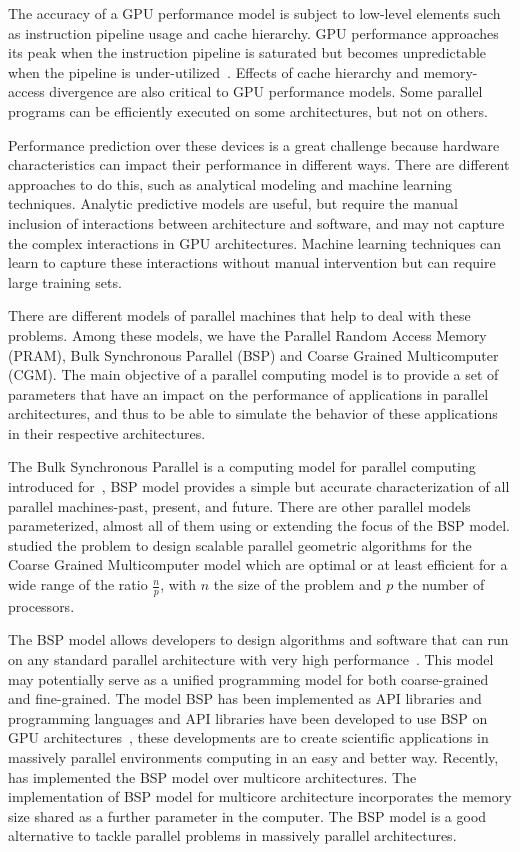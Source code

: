 The accuracy of a GPU performance model is subject to low-level elements such as instruction pipeline usage and cache hierarchy. GPU performance approaches its peak when the instruction pipeline is saturated but becomes unpredictable when the pipeline is under-utilized~\citep{Baghsorkhi:2010:APM}. Effects of cache hierarchy and memory-access divergence are also critical to GPU performance models. Some parallel programs can be efficiently executed on some architectures, but not on others. 

Performance prediction over these devices is a great challenge because hardware characteristics can impact their performance in different ways. There are different approaches to do this, such as analytical modeling and machine learning techniques. Analytic predictive models are useful, but require the manual inclusion of interactions between architecture and software, and may not capture the complex interactions in GPU architectures. Machine learning techniques can learn to capture these interactions without manual intervention but can require large training sets. 

There are different models of parallel machines that help to deal with these problems. Among these models, we have the Parallel Random Access Memory (PRAM), Bulk Synchronous Parallel (BSP) and Coarse Grained Multicomputer (CGM). The main objective of a parallel computing model is to provide a set of parameters that have an impact on the performance of applications in parallel architectures, and thus to be able to simulate the behavior of these applications in their respective architectures.

The Bulk Synchronous Parallel is a computing model for parallel computing introduced for~\cite{Valiant:1990}, BSP model provides a simple but accurate characterization of all parallel machines-past, present, and future. There are other parallel models parameterized, almost all of them using or extending the focus of the BSP model. \cite{Dehne:2002} studied the problem to design scalable parallel geometric algorithms for the Coarse Grained Multicomputer model which are optimal or at least efficient for a wide range of the ratio $\frac{n}{p}$, with $n$ the size of the problem and $p$ the number of processors.

The BSP model allows developers to design algorithms and software that can run on any standard parallel architecture with very high performance~\citep{goldchleger2005implementation}. This model may potentially serve as a unified programming model for both coarse-grained and fine-grained. The model BSP has been implemented as API libraries and programming languages \citep{BSPLib} and API libraries have been developed to use BSP on GPU architectures~\citep{bsgp}, these developments are to create scientific applications in massively parallel environments computing in an easy and better way. Recently, ~\cite{Valiant:2011} has implemented the BSP model over multicore architectures. The implementation of BSP model for multicore architecture incorporates the memory size shared as a further parameter in the computer. The BSP model is a good alternative to tackle parallel problems in massively parallel architectures. 

